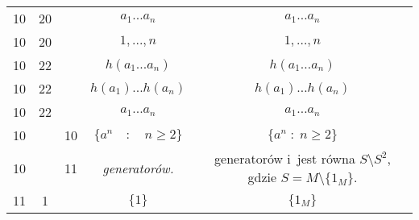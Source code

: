 \documentclass[a4paper,11pt]{article}
\begin{document}
\begin{center}
\begin{tabular}{|c|c|c|c|c|}
    10 & 20 & & $a_{ 1 } ... a_{ n }$ & $a_{ 1 } \ldots a_{ n }$ \\
    10 & 20 & & $1, ..., n$ & $1, \ldots, n$ \\
    10 & 22 & & $h( a_{ 1 } ... a_{ n } )$ & $h( a_{ 1 } \ldots a_{ n } )$ \\
    10 & 22 & & $h( a_{ 1 } ) ... h( a_{ n } )$
           & $h( a_{ 1 } ) \ldots h( a_{ n } )$ \\
    10 & 22 & & $a_{ 1 } ... a_{ n }$ & $a_{ 1 } \ldots a_{ n }$ \\
    10 & & 10 & $\{ a^{ n } \quad : \quad n \geq 2 \}$ & $\{ a^{ n } \; : \; n \geq 2 \}$ \\
    10 & & 11 & \textit{generatorów.}
    & generatorów i~jest równa $S \setminus S^{ 2 }$, gdzie
      $S = M \setminus \{ 1_{ M } \}$. \\
    11 &  1 & & $\{ 1 \}$ & $\{ 1_{ M } \}$ \\
    \hline
  \end{tabular}





  \newpage


\end{center}
\end{document}
